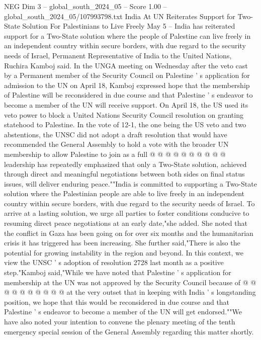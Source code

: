 \begin{textsample}{NEG Dim 3 – global\_south\_2024\_05 – Score 1.00 – global\_south\_2024\_05/107993798.txt}  \label{ex:f3_neg_355}
India At UN Reiterates Support for Two-State Solution For Palestinians to Live Freely May 5 -- India has reiterated support for a Two-State solution where the people of Palestine can live freely in an independent country within secure borders, with due regard to the security needs of Israel, Permanent Representative of India to the United Nations, Ruchira Kamboj said.
In the UNGA meeting on Wednesday after the veto cast by a Permanent member of the Security Council on Palestine ' s application for admission to the UN on April 18, Kamboj expressed hope that the membership of Palestine will be reconsidered in due course and that Palestine ' s endeavor to become a member of the UN will receive support.
On April 18, the US used its veto power to block a United Nations Security Council resolution on granting statehood to Palestine.
In the vote of 12-1, the one being the US veto and two abstentions, the UNSC did not adopt a draft resolution that would have recommended the General Assembly to hold a vote with the broader UN membership to allow Palestine to join as a full @ @ @ @ @ @ @ @ @ @ leadership has repeatedly emphasized that only a Two-State solution, achieved through direct and meaningful negotiations between both sides on final status issues, will deliver enduring peace.""India is committed to supporting a Two-State solution where the Palestinian people are able to live freely in an independent country within secure borders, with due regard to the security needs of Israel.
To arrive at a lasting solution, we urge all parties to foster conditions conducive to resuming direct peace negotiations at an early date,"she added.
She noted that the conflict in Gaza has been going on for over six months and the humanitarian crisis it has triggered has been increasing.
She further said,"There is also the potential for growing instability in the region and beyond.
In this context, we view the UNSC ' s adoption of resolution 2728 last month as a positive step."Kamboj said,"While we have noted that Palestine ' s application for membership at the UN was not approved by the Security Council because of @ @ @ @ @ @ @ @ @ @ at the very outset that in keeping with India ' s longstanding position, we hope that this would be reconsidered in due course and that Palestine ' s endeavor to become a member of the UN will get endorsed.""We have also noted your intention to convene the plenary meeting of the tenth emergency special session of the General Assembly regarding this matter shortly.

\end{textsample}
